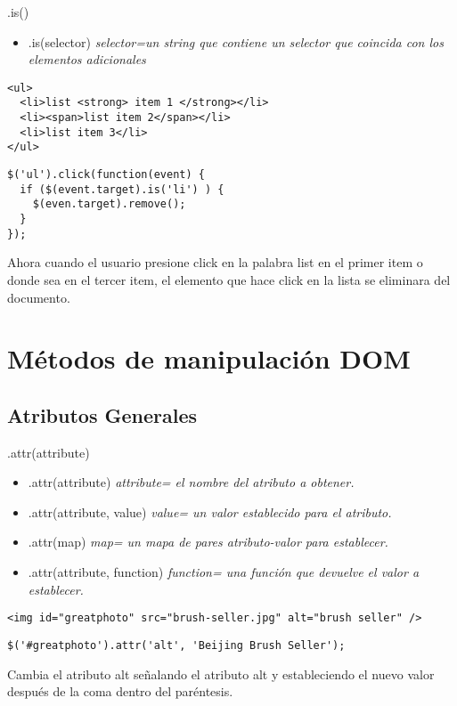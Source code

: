 \begin{frame}[fragile]{.is()} %
\begin{itemize}
    \item .is(selector) \textit{ selector=un string que contiene un selector que coincida con los elementos adicionales}
\end{itemize}
\begin{lstlisting}
<ul>
  <li>list <strong> item 1 </strong></li>
  <li><span>list item 2</span></li>
  <li>list item 3</li>
</ul>
\end{lstlisting}
\begin{lstlisting}
$('ul').click(function(event) {
  if ($(event.target).is('li') ) {
    $(even.target).remove();
  }
});
\end{lstlisting}
Ahora cuando el usuario presione click en la palabra list en el primer item o
donde sea en el tercer item, el elemento que hace click en la lista se
eliminara del documento.
\end{frame}

\section{Métodos de manipulación DOM} %

\subsection{Atributos Generales} %

\begin{frame}[fragile]{.attr(attribute)} %
\begin{itemize}
    \item .attr(attribute) \textit{ attribute= el nombre del atributo a
    obtener.}
    \item .attr(attribute,  value) \textit{ value= un valor establecido para el atributo.}
    \item .attr(map) \textit{ map= un mapa de pares atributo-valor para
    establecer.}
    \item .attr(attribute,  function) \textit{ function= una función que
    devuelve el valor a establecer.}
\end{itemize}
\begin{lstlisting}
<img id="greatphoto" src="brush-seller.jpg" alt="brush seller" />
\end{lstlisting}
\begin{lstlisting}
$('#greatphoto').attr('alt', 'Beijing Brush Seller');
\end{lstlisting}
Cambia el atributo alt señalando el atributo alt y estableciendo el nuevo valor después de la coma dentro del paréntesis.
\end{frame}

